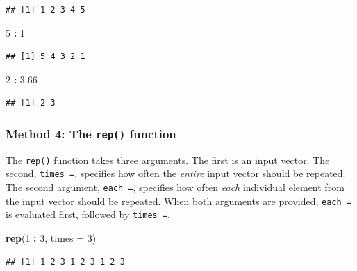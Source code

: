 \documentclass[]{book}
\newenvironment{Shaded}{\begin{snugshade}}{\end{snugshade}}
\newcommand{\DataTypeTok}[1]{\textcolor[rgb]{0.13,0.29,0.53}{#1}}
\newcommand{\DecValTok}[1]{\textcolor[rgb]{0.00,0.00,0.81}{#1}}
\newcommand{\FloatTok}[1]{\textcolor[rgb]{0.00,0.00,0.81}{#1}}
\newcommand{\KeywordTok}[1]{\textcolor[rgb]{0.13,0.29,0.53}{\textbf{#1}}}
\newcommand{\NormalTok}[1]{#1}
\newcommand{\OperatorTok}[1]{\textcolor[rgb]{0.81,0.36,0.00}{\textbf{#1}}}
\newcommand{\StringTok}[1]{\textcolor[rgb]{0.31,0.60,0.02}{#1}}
\begin{document}
\begin{verbatim}
## [1] 1 2 3 4 5
\end{verbatim}

\begin{Shaded}
\begin{Highlighting}[]
\DecValTok{5} \OperatorTok{:}\StringTok{ }\DecValTok{1}
\end{Highlighting}
\end{Shaded}

\begin{verbatim}
## [1] 5 4 3 2 1
\end{verbatim}

\begin{Shaded}
\begin{Highlighting}[]
\DecValTok{2} \OperatorTok{:}\StringTok{ }\FloatTok{3.66}
\end{Highlighting}
\end{Shaded}

\begin{verbatim}
## [1] 2 3
\end{verbatim}

\hypertarget{method-4-the-rep-function}{%
\subsubsection*{\texorpdfstring{Method 4: The \texttt{rep()} function}{Method 4: The rep() function}}\label{method-4-the-rep-function}}

The \texttt{rep()} function takes three arguments. The first is an input vector. The second, \texttt{times\ =}, specifies how often the \emph{entire} input vector should be repeated. The second argument, \texttt{each\ =}, specifies how often \emph{each} individual element from the input vector should be repeated. When both arguments are provided, \texttt{each\ =} is evaluated first, followed by \texttt{times\ =}.

\begin{Shaded}
\begin{Highlighting}[]
\KeywordTok{rep}\NormalTok{(}\DecValTok{1} \OperatorTok{:}\StringTok{ }\DecValTok{3}\NormalTok{, }\DataTypeTok{times =} \DecValTok{3}\NormalTok{)}
\end{Highlighting}
\end{Shaded}

\begin{verbatim}
## [1] 1 2 3 1 2 3 1 2 3
\end{verbatim}
\end{document}
